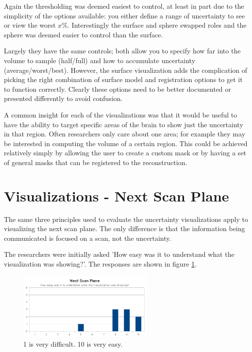 Again the thresholding was deemed easiest to control, at least in part due to the simplicity of the options available: you either define a range of uncertainty to see or view the worst $x\%$. Interestingly the surface and sphere swapped roles and the sphere was deemed easier to control than the surface.

Largely they have the same controls; both allow you to specify how far into the volume to sample (half/full) and how to accumulate uncertainty (average/worst/best). However, the surface visualization adds the complication of picking the right combination of surface model and registration options to get it to function correctly. Clearly these options need to be better documented or presented differently to avoid confusion.

A common insight for each of the visualizations was that it would be useful to have the ability to target specific areas of the brain to show just the uncertainty in that region. Often researchers only care about one area; for example they may be interested in computing the volume of a certain region. This could be achieved relatively simply by allowing the user to create a custom mask or by having a set of general masks that can be registered to the reconstruction.


\newpage
\section{Visualizations - Next Scan Plane}
The same three principles used to evaluate the uncertainty visualizations apply to visualizing the next scan plane. The only difference is that the information being communicated is focused on a scan, not the uncertainty.

The researchers were initially asked 'How easy was it to understand what the visualization was showing?'. The responses are shown in figure \ref{fig:eval_next_scan_plane_q1}.

\begin{figure}[h]
    \centering
  \includegraphics[width=0.6\textwidth]{images/evaluation/graph_next_scan_plane_1.png}
    \caption{1 is very difficult. 10 is very easy.}\label{fig:eval_next_scan_plane_q1}
\end{figure}

